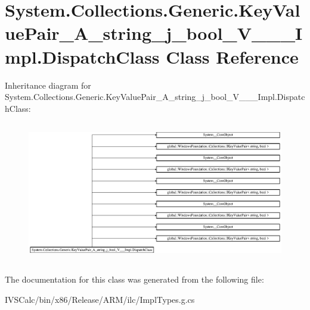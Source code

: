 \hypertarget{class_system_1_1_collections_1_1_generic_1_1_key_value_pair___a__string__j__bool___v_______impl_1_1_dispatch_class}{}\section{System.\+Collections.\+Generic.\+Key\+Value\+Pair\+\_\+\+A\+\_\+string\+\_\+j\+\_\+bool\+\_\+\+V\+\_\+\+\_\+\+\_\+\+Impl.\+Dispatch\+Class Class Reference}
\label{class_system_1_1_collections_1_1_generic_1_1_key_value_pair___a__string__j__bool___v_______impl_1_1_dispatch_class}
Inheritance diagram for System.\+Collections.\+Generic.\+Key\+Value\+Pair\+\_\+\+A\+\_\+string\+\_\+j\+\_\+bool\+\_\+\+V\+\_\+\+\_\+\+\_\+\+Impl.\+Dispatch\+Class\+:\begin{figure}[H]
\begin{center}
\leavevmode
\includegraphics[height=6.222222cm]{class_system_1_1_collections_1_1_generic_1_1_key_value_pair___a__string__j__bool___v_______impl_1_1_dispatch_class}
\end{center}
\end{figure}


The documentation for this class was generated from the following file\+:\begin{DoxyCompactItemize}
\item 
I\+V\+S\+Calc/bin/x86/\+Release/\+A\+R\+M/ilc/Impl\+Types.\+g.\+cs\end{DoxyCompactItemize}
